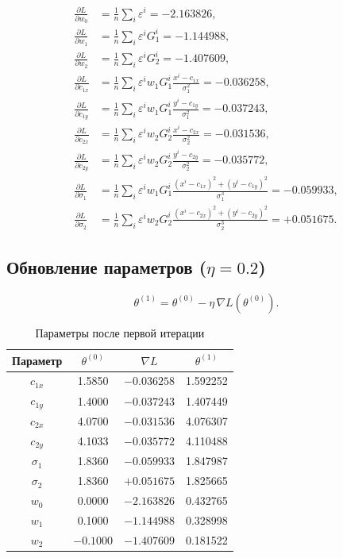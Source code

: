 \documentclass[12pt,a4paper]{article}
\begin{document}
\begin{align}
  \frac{\partial L}{\partial w_0} &= \frac{1}{n}\sum_{i}\varepsilon^i = -2.163826, \\[4pt]
  \frac{\partial L}{\partial w_1} &= \frac{1}{n}\sum_{i}\varepsilon^i G_1^i = -1.144988, \\[4pt]
  \frac{\partial L}{\partial w_2} &= \frac{1}{n}\sum_{i}\varepsilon^i G_2^i = -1.407609, \\[4pt]
  \frac{\partial L}{\partial c_{1x}} &= \frac{1}{n}\sum_{i}\varepsilon^i w_1 G_1^i \frac{x^i-c_{1x}}{\sigma_1^2} = -0.036258, \\[4pt]
  \frac{\partial L}{\partial c_{1y}} &= \frac{1}{n}\sum_{i}\varepsilon^i w_1 G_1^i \frac{y^i-c_{1y}}{\sigma_1^2} = -0.037243, \\[4pt]
  \frac{\partial L}{\partial c_{2x}} &= \frac{1}{n}\sum_{i}\varepsilon^i w_2 G_2^i \frac{x^i-c_{2x}}{\sigma_2^2} = -0.031536, \\[4pt]
  \frac{\partial L}{\partial c_{2y}} &= \frac{1}{n}\sum_{i}\varepsilon^i w_2 G_2^i \frac{y^i-c_{2y}}{\sigma_2^2} = -0.035772, \\[4pt]
  \frac{\partial L}{\partial \sigma_1} &= \frac{1}{n}\sum_{i}\varepsilon^i w_1 G_1^i \frac{(x^i-c_{1x})^2+(y^i-c_{1y})^2}{\sigma_1^3} = -0.059933, \\[4pt]
  \frac{\partial L}{\partial \sigma_2} &= \frac{1}{n}\sum_{i}\varepsilon^i w_2 G_2^i \frac{(x^i-c_{2x})^2+(y^i-c_{2y})^2}{\sigma_2^3} = +0.051675.
\end{align}

\subsection{Обновление параметров ($\eta = 0.2$)}

\[
  \theta^{(1)} = \theta^{(0)} - \eta\,\nabla L(\theta^{(0)}).
\]

\begin{table}[H]
\centering
\caption{Параметры после первой итерации}
\begin{tabular}{cccc}
\toprule
Параметр & $\theta^{(0)}$ & $\nabla L$ & $\theta^{(1)}$ \\
\midrule
$c_{1x}$  & 1.5850  & $-0.036258$ & 1.592252 \\
$c_{1y}$  & 1.4000  & $-0.037243$ & 1.407449 \\
$c_{2x}$  & 4.0700  & $-0.031536$ & 4.076307 \\
$c_{2y}$  & 4.1033  & $-0.035772$ & 4.110488 \\
$\sigma_1$ & 1.8360 & $-0.059933$ & 1.847987 \\
$\sigma_2$ & 1.8360 & $+0.051675$ & 1.825665 \\
$w_0$     & 0.0000  & $-2.163826$ & 0.432765 \\
$w_1$     & 0.1000  & $-1.144988$ & 0.328998 \\
$w_2$     & $-0.1000$ & $-1.407609$ & 0.181522 \\
\bottomrule
\end{tabular}
\end{table}
\end{document}

